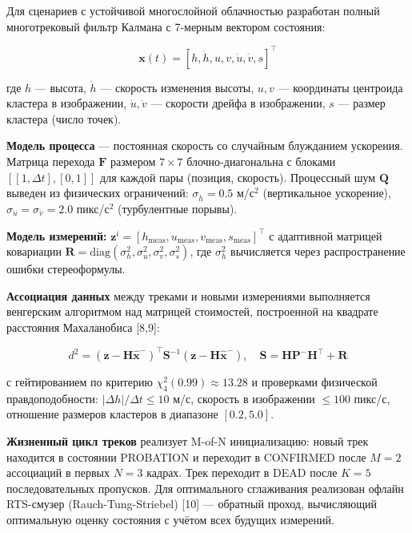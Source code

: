 \documentclass[11pt]{article} %
\begin{document}
Для сценариев с устойчивой многослойной облачностью разработан полный многотрековый фильтр Калмана с 7-мерным вектором состояния:
	
	\begin{equation}
		\mathbf{x}(t) = [h, \dot{h}, u, v, \dot{u}, \dot{v}, s]^\top
	\end{equation}
	
	где $h$ — высота, $\dot{h}$ — скорость изменения высоты, $u, v$ — координаты центроида кластера в изображении, $\dot{u}, \dot{v}$ — скорости дрейфа в изображении, $s$ — размер кластера (число точек).
	
	\textbf{Модель процесса} — постоянная скорость со случайным блужданием ускорения. Матрица перехода $\mathbf{F}$ размером $7 \times 7$ блочно-диагональна с блоками $[[1, \Delta t], [0, 1]]$ для каждой пары (позиция, скорость). Процессный шум $\mathbf{Q}$ выведен из физических ограничений: $\sigma_{\ddot{h}} = 0.5$ м/с$^2$ (вертикальное ускорение), $\sigma_{\ddot{u}} = \sigma_{\ddot{v}} = 2.0$ пикс/с$^2$ (турбулентные порывы).
	
	\textbf{Модель измерений:} $\mathbf{z}^i = [h_\text{meas}, u_\text{meas}, v_\text{meas}, s_\text{meas}]^\top$ с адаптивной матрицей ковариации $\mathbf{R} = \text{diag}(\sigma_h^2, \sigma_u^2, \sigma_v^2, \sigma_s^2)$, где $\sigma_h^2$ вычисляется через распространение ошибки стереоформулы.
	
	\textbf{Ассоциация данных} между треками и новыми измерениями выполняется венгерским алгоритмом над матрицей стоимостей, построенной на квадрате расстояния Махаланобиса [8,9]:
	
	\begin{equation}
		d^2 = (\mathbf{z} - \mathbf{H}\hat{\mathbf{x}}^-)^\top \mathbf{S}^{-1} (\mathbf{z} - \mathbf{H}\hat{\mathbf{x}}^-), \quad \mathbf{S} = \mathbf{H}\mathbf{P}^-\mathbf{H}^\top + \mathbf{R}
	\end{equation}
	
	с гейтированием по критерию $\chi^2_4(0.99) \approx 13.28$ и проверками физической правдоподобности: $|\Delta h|/\Delta t \le 10$ м/с, скорость в изображении $\le 100$ пикс/с, отношение размеров кластеров в диапазоне $[0.2, 5.0]$.
	
	\textbf{Жизненный цикл треков} реализует M-of-N инициализацию: новый трек находится в состоянии PROBATION и переходит в CONFIRMED после $M = 2$ ассоциаций в первых $N = 3$ кадрах. Трек переходит в DEAD после $K = 5$ последовательных пропусков. 	Для оптимального сглаживания реализован офлайн RTS-смузер (Rauch-Tung-Striebel) [10] — обратный проход, вычисляющий оптимальную оценку состояния с учётом всех будущих измерений.
	
\end{document}
